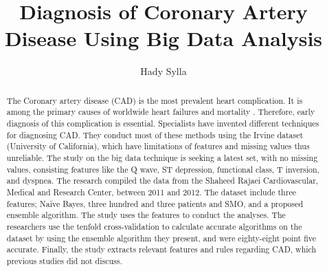 \documentclass[sigconf]{acmart}
\begin{document}
\title{Diagnosis of Coronary Artery Disease Using Big Data Analysis}
\author{Hady Sylla}



\begin{abstract}
The Coronary artery disease (CAD) is the most prevalent heart complication. It is among the primary causes of worldwide heart failures and mortality \cite{ali}. Therefore, early diagnosis of this complication is essential. Specialists have invented different techniques for diagnosing CAD. They conduct most of these methods using the Irvine dataset (University of California), which have limitations of features and missing values thus unreliable. The study on the big data technique is seeking a latest set, with no missing values, consisting features like the Q wave, ST depression, functional class, T inversion, and dyspnea. The research compiled the data from the Shaheed Rajaei Cardiovascular, Medical and Research Center, between 2011 and 2012. The dataset include three features; Naïve Bayes, three hundred and three patients and SMO, and a proposed ensemble algorithm. The study uses the features to conduct the analyses. The researchers use the tenfold cross-validation to calculate accurate algorithms on the dataset by using the ensemble algorithm they present, and were eighty-eight point five accurate. Finally, the study extracts relevant features and rules regarding CAD, which previous studies did not discuss.

\end{abstract}


\maketitle
\end{document}
